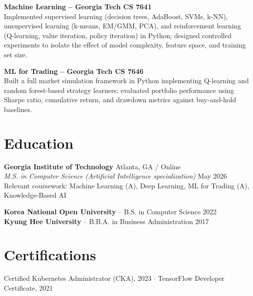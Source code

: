 \documentclass[10pt,a4paper]{article}
\begin{document}
\vspace{4pt}
\textbf{Machine Learning -- Georgia Tech CS 7641} \\
Implemented supervised learning (decision trees, AdaBoost, SVMs, k-NN), unsupervised learning (k-means, EM/GMM, PCA), and reinforcement learning (Q-learning, value iteration, policy iteration) in Python; designed controlled experiments to isolate the effect of model complexity, feature space, and training set size.

\vspace{4pt}
\textbf{ML for Trading -- Georgia Tech CS 7646} \\
Built a full market simulation framework in Python implementing Q-learning and random forest-based strategy learners; evaluated portfolio performance using Sharpe ratio, cumulative return, and drawdown metrics against buy-and-hold baselines.

\section*{Education}
\textbf{Georgia Institute of Technology} \hfill Atlanta, GA / Online \\
\textit{M.S. in Computer Science (Artificial Intelligence specialization)} \hfill May 2026 \\
Relevant coursework: Machine Learning (A), Deep Learning, ML for Trading (A), Knowledge-Based AI

\vspace{2pt}
\textbf{Korea National Open University} \enspace -- \enspace B.S. in Computer Science \hfill 2022 \\
\textbf{Kyung Hee University} \enspace -- \enspace B.B.A. in Business Administration \hfill 2017

\section*{Certifications}
Certified Kubernetes Administrator (CKA), 2023 \enspace $\cdot$ \enspace TensorFlow Developer Certificate, 2021
\end{document}
